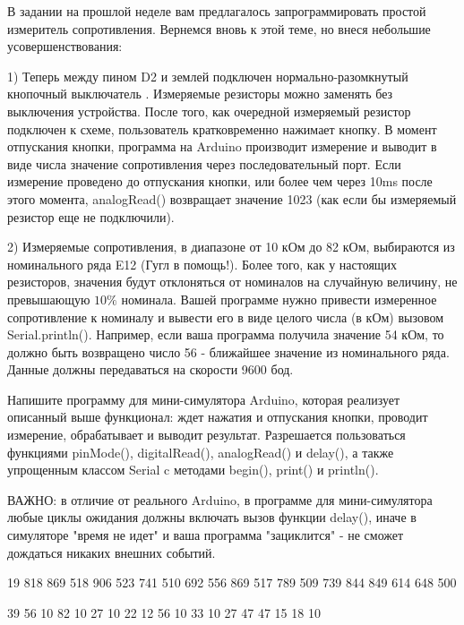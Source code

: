 
В задании на прошлой неделе вам предлагалось запрограммировать простой измеритель сопротивления.  
Вернемся вновь к этой теме, но внеся небольшие усовершенствования:  


1) Теперь между пином D2 и землей подключен нормально-разомкнутый кнопочный выключатель .  
Измеряемые резисторы можно заменять без выключения устройства.  После того, как очередной 
измеряемый резистор подключен к схеме, пользователь кратковременно нажимает кнопку. В момент 
отпускания кнопки, программа на Arduino производит измерение и выводит в виде числа значение 
сопротивления через последовательный порт.   Если измерение проведено до отпускания кнопки, 
или более чем через 10ms после этого момента,  analogRead() возвращает значение 1023 
(как если бы измеряемый резистор еще не подключили).  

2) Измеряемые сопротивления, в диапазоне от 10 кОм до 82 кОм, выбираются из номинального ряда E12 
(Гугл в помощь!). Более того, как у настоящих резисторов, значения будут отклоняться от 
номиналов на случайную величину, не превышающую $10\%$ номинала.  Вашей программе нужно привести 
измеренное сопротивление к номиналу и вывести его в виде целого числа (в кОм) вызовом Serial.println().  
Например, если ваша программа получила значение 54 кОм, то должно быть возвращено число 56 - ближайшее значение из номинального ряда.   Данные должны передаваться на скорости 9600 бод.

Напишите программу для мини-симулятора Arduino, которая реализует описанный выше функционал:  ждет нажатия и отпускания кнопки, проводит измерение, обрабатывает и выводит результат.  Разрешается пользоваться функциями pinMode(),  digitalRead(), analogRead() и delay(),  а также упрощенным классом Serial c методами begin(), print() и println().  

ВАЖНО: в отличие от реального Arduino, в программе для мини-симулятора любые циклы ожидания должны включать вызов функции delay(),  иначе в симуляторе "время не идет" и ваша программа  "зациклится" - не сможет дождаться никаких внешних событий.

\begin{myverbbox}[\small]{\vinput}
    19
    818
    869
    518
    906
    523
    741
    510
    692
    556
    869
    517
    789
    509
    739
    844
    849
    614
    648
    500
\end{myverbbox}
\begin{myverbbox}[\small]{\voutput}
    39
    56
    10
    82
    10
    27
    10
    22
    12
    56
    10
    33
    10
    27
    47
    47
    15
    18
    10
\end{myverbbox}

